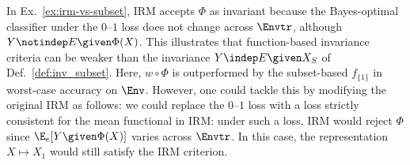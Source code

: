 


In Ex.~\ref{ex:irm-vs-subset}, IRM accepts $\Phi$ as invariant because the Bayes-optimal classifier under the $0$--$1$ loss does not change across $\Envtr$, although $Y \notindep E \given \Phi(X)$. This illustrates that function-based invariance criteria can be weaker than the invariance $Y \indep E \given X_S$ of Def.~\ref{def:inv_subset}. Here, $w \circ \Phi$ is outperformed by the subset-based $f_{\{1\}}$ in worst-case accuracy on $\Env$. However, one could tackle this by 
modifying the original IRM as follows: we could replace
the $0$--$1$ loss with a loss strictly consistent for the mean functional in IRM: under such a loss, IRM would reject $\Phi$ since $\E_e[Y \given \Phi(X)]$ varies across $\Envtr$. In this case, the representation $X \mapsto X_1$ would still satisfy the IRM criterion.




